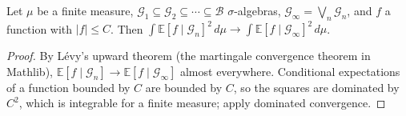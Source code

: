 \begin{lemma}\label{lem:sg:levy}
  \leanok
Let $\mu$ be a finite measure, $\mathscr G_1\subseteq\mathscr G_2\subseteq\cdots\subseteq\mathscr B$ $\sigma$-algebras, $\mathscr G_\infty=\bigvee_n\mathscr G_n$, and $f$ a function with $|f|\le C$. Then
$\int\mathbb E[f\mid\mathscr G_n]^2\,d\mu\to\int\mathbb E[f\mid\mathscr G_\infty]^2\,d\mu$.
\end{lemma}

\begin{proof}
  \leanok
By L\'evy's upward theorem (the martingale convergence theorem in Mathlib), $\mathbb E[f\mid\mathscr G_n]\to\mathbb E[f\mid\mathscr G_\infty]$ almost everywhere. Conditional expectations of a function bounded by $C$ are bounded by $C$,
so the squares are dominated by $C^2$, which is integrable for a finite measure; apply dominated convergence.
\end{proof}

